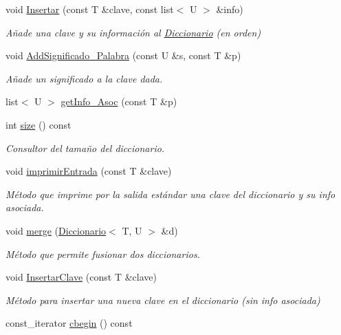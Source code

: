 \begin{DoxyCompactItemize}
void \hyperlink{classDiccionario_af520b73907852cc8002260ddf9fb822c}{Insertar} (const T \&clave, const list$<$ U $>$ \&info)
\begin{DoxyCompactList}\small\item\em Añade una clave y su información al \hyperlink{classDiccionario}{Diccionario} (en orden) \end{DoxyCompactList}\item 
void \hyperlink{classDiccionario_a7e167da231bff610001df3c20cc9b7a7}{Add\+Significado\+\_\+\+Palabra} (const U \&s, const T \&p)
\begin{DoxyCompactList}\small\item\em Añade un significado a la clave dada. \end{DoxyCompactList}\item 
list$<$ U $>$ \hyperlink{classDiccionario_ad262cd8d8e11286beecfa4851ec2c948}{get\+Info\+\_\+\+Asoc} (const T \&p)
\item 
int \hyperlink{classDiccionario_aa576b001759429fd58210ca57257d6f8}{size} () const
\begin{DoxyCompactList}\small\item\em Consultor del tamaño del diccionario. \end{DoxyCompactList}\item 
void \hyperlink{classDiccionario_a62c1870d9b00a467364d8c39a0bda305}{imprimir\+Entrada} (const T \&clave)
\begin{DoxyCompactList}\small\item\em Método que imprime por la salida estándar una clave del diccionario y su info asociada. \end{DoxyCompactList}\item 
void \hyperlink{classDiccionario_a774c3decde31fff339371374f74ca9d8}{merge} (\hyperlink{classDiccionario}{Diccionario}$<$ T, U $>$ \&d)
\begin{DoxyCompactList}\small\item\em Método que permite fusionar dos diccionarios. \end{DoxyCompactList}\item 
void \hyperlink{classDiccionario_ae5fdb31e4d61fa67cbfbccdc9d46e6ca}{Insertar\+Clave} (const T \&clave)
\begin{DoxyCompactList}\small\item\em Método para insertar una nueva clave en el diccionario (sin info asociada) \end{DoxyCompactList}\item 
const\+\_\+iterator \hyperlink{classDiccionario_a8d18a8044a6c1a1482762fd84ab37017}{cbegin} () const

\end{DoxyCompactItemize}
